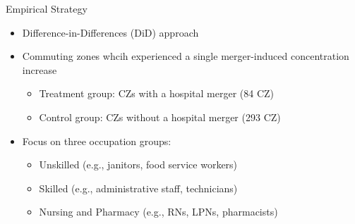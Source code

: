 \documentclass{beamer}
\begin{document}
\begin{frame}{Empirical Strategy}
  \begin{itemize}
    \item Difference-in-Differences (DiD) approach
    \item Commuting zones whcih experienced a single merger-induced concentration increase
    \begin{itemize}
      \item Treatment group: CZs with a hospital merger (84 CZ)
      \item Control group: CZs without a hospital merger (293 CZ)
    \end{itemize}
    \item Focus on three occupation groups:
    \begin{itemize}
      \item Unskilled (e.g., janitors, food service workers)
      \item Skilled (e.g., administrative staff, technicians)
      \item Nursing and Pharmacy (e.g., RNs, LPNs, pharmacists)
    \end{itemize}
  \end{itemize}
\end{frame}
\end{document}
